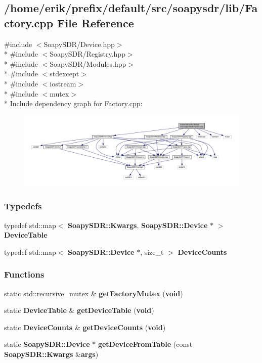 \subsection{/home/erik/prefix/default/src/soapysdr/lib/\+Factory.cpp File Reference}
\label{Factory_8cpp}
{\ttfamily \#include $<$Soapy\+S\+D\+R/\+Device.\+hpp$>$}\\*
{\ttfamily \#include $<$Soapy\+S\+D\+R/\+Registry.\+hpp$>$}\\*
{\ttfamily \#include $<$Soapy\+S\+D\+R/\+Modules.\+hpp$>$}\\*
{\ttfamily \#include $<$stdexcept$>$}\\*
{\ttfamily \#include $<$iostream$>$}\\*
{\ttfamily \#include $<$mutex$>$}\\*
Include dependency graph for Factory.\+cpp\+:
\nopagebreak
\begin{figure}[H]
\begin{center}
\leavevmode
\includegraphics[width=350pt]{d5/d2b/Factory_8cpp__incl}
\end{center}
\end{figure}
\subsubsection*{Typedefs}
\begin{DoxyCompactItemize}
\item 
typedef std\+::map$<$ {\bf Soapy\+S\+D\+R\+::\+Kwargs}, {\bf Soapy\+S\+D\+R\+::\+Device} $\ast$ $>$ {\bf Device\+Table}
\item 
typedef std\+::map$<$ {\bf Soapy\+S\+D\+R\+::\+Device} $\ast$, size\+\_\+t $>$ {\bf Device\+Counts}
\end{DoxyCompactItemize}
\subsubsection*{Functions}
\begin{DoxyCompactItemize}
\item 
static std\+::recursive\+\_\+mutex \& {\bf get\+Factory\+Mutex} ({\bf void})
\item 
static {\bf Device\+Table} \& {\bf get\+Device\+Table} ({\bf void})
\item 
static {\bf Device\+Counts} \& {\bf get\+Device\+Counts} ({\bf void})
\item 
static {\bf Soapy\+S\+D\+R\+::\+Device} $\ast$ {\bf get\+Device\+From\+Table} (const {\bf Soapy\+S\+D\+R\+::\+Kwargs} \&{\bf args})
\end{DoxyCompactItemize}



